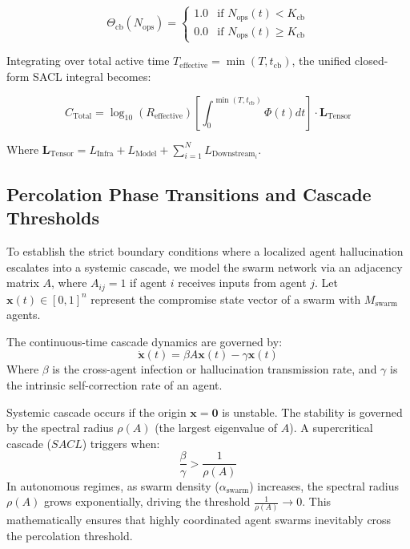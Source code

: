 \begin{equation}
\Theta_{\text{cb}}(N_{\text{ops}}) = \begin{cases} 
1.0 & \text{if } N_{\text{ops}}(t) < K_{\text{cb}} \\
0.0 & \text{if } N_{\text{ops}}(t) \ge K_{\text{cb}} 
\end{cases}
\end{equation}

Integrating over total active time $T_{\text{effective}} = \min(T, t_{\text{cb}})$, the unified closed-form SACL integral becomes:

\begin{equation}
C_{\text{Total}} = \log_{10}(R_{\text{effective}}) \left[ \int_{0}^{\min(T, t_{\text{cb}})} \Phi(t) dt \right] \cdot \mathbf{L}_{\text{Tensor}}
\label{eq:sacl_closed}
\end{equation}

Where $\mathbf{L}_{\text{Tensor}} = L_{\text{Infra}} + L_{\text{Model}} + \sum_{i=1}^{N} L_{\text{Downstream}_i}$.

\subsection{Percolation Phase Transitions and Cascade Thresholds}
To establish the strict boundary conditions where a localized agent hallucination escalates into a systemic cascade, we model the swarm network via an adjacency matrix $A$, where $A_{ij} = 1$ if agent $i$ receives inputs from agent $j$. Let $\mathbf{x}(t) \in [0,1]^n$ represent the compromise state vector of a swarm with $M_{\text{swarm}}$ agents. 

The continuous-time cascade dynamics are governed by:
\begin{equation}
\dot{\mathbf{x}}(t) = \beta A \mathbf{x}(t) - \gamma \mathbf{x}(t)
\end{equation}
Where $\beta$ is the cross-agent infection or hallucination transmission rate, and $\gamma$ is the intrinsic self-correction rate of an agent. 

Systemic cascade occurs if the origin $\mathbf{x} = \mathbf{0}$ is unstable. The stability is governed by the spectral radius $\rho(A)$ (the largest eigenvalue of $A$). A supercritical cascade ($SACL$) triggers when:
\begin{equation}
\frac{\beta}{\gamma} > \frac{1}{\rho(A)}
\end{equation}
In autonomous regimes, as swarm density ($\alpha_{\text{swarm}}$) increases, the spectral radius $\rho(A)$ grows exponentially, driving the threshold $\frac{1}{\rho(A)} \to 0$. This mathematically ensures that highly coordinated agent swarms inevitably cross the percolation threshold.
